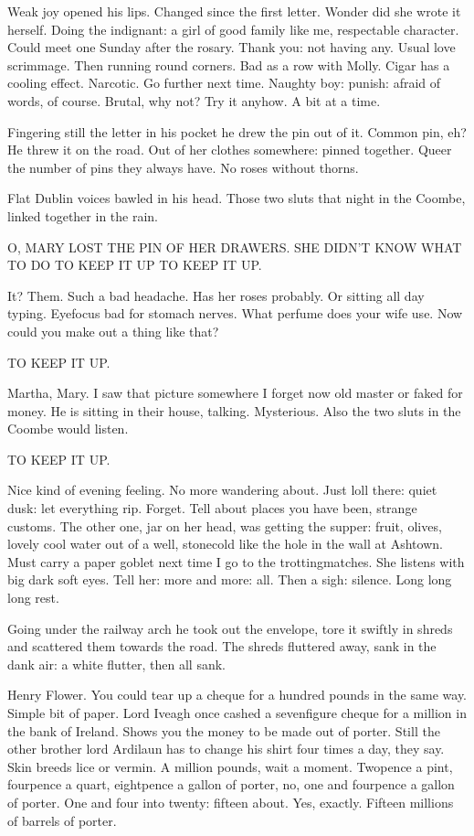 Weak joy opened his lips. Changed since the first letter. Wonder
did she wrote it herself. Doing the indignant: a girl of good
family like me, respectable character. Could meet one Sunday after the
rosary. Thank you: not having any. Usual love scrimmage. Then running
round corners. Bad as a row with Molly. Cigar has a cooling effect.
Narcotic. Go further next time. Naughty boy: punish: afraid of words, of
course. Brutal, why not? Try it anyhow. A bit at a time.

Fingering still the letter in his pocket he drew the pin out of it.
Common pin, eh? He threw it on the road. Out of her clothes somewhere:
pinned together. Queer the number of pins they always have. No roses
without thorns.

Flat Dublin voices bawled in his head. Those two sluts that night in
the Coombe, linked together in the rain.


    O, MARY LOST THE PIN OF HER DRAWERS.
    SHE DIDN'T KNOW WHAT TO DO
    TO KEEP IT UP
    TO KEEP IT UP.


It? Them. Such a bad headache. Has her roses probably. Or sitting all day
typing. Eyefocus bad for stomach nerves. What perfume does your wife
use. Now could you make out a thing like that?

    TO KEEP IT UP.

Martha, Mary. I saw that picture somewhere I forget now old master or
faked for money. He is sitting in their house, talking. Mysterious. Also
the two sluts in the Coombe would listen.

    TO KEEP IT UP.

Nice kind of evening feeling. No more wandering about. Just loll there:
quiet dusk: let everything rip. Forget. Tell about places you have been,
strange customs. The other one, jar on her head, was getting the supper:
fruit, olives, lovely cool water out of a well, stonecold like the hole in
the wall at Ashtown. Must carry a paper goblet next time I go to the
trottingmatches. She listens with big dark soft eyes. Tell her: more and
more: all. Then a sigh: silence. Long long long rest.

Going under the railway arch he took out the envelope, tore it swiftly
in shreds and scattered them towards the road. The shreds fluttered away,
sank in the dank air: a white flutter, then all sank.

Henry Flower. You could tear up a cheque for a hundred pounds in
the same way. Simple bit of paper. Lord Iveagh once cashed a sevenfigure
cheque for a million in the bank of Ireland. Shows you the money to be
made out of porter. Still the other brother lord Ardilaun has to change
his shirt four times a day, they say. Skin breeds lice or vermin. A
million pounds, wait a moment. Twopence a pint, fourpence a quart,
eightpence a gallon of porter, no, one and fourpence a gallon of porter.
One and four into twenty: fifteen about. Yes, exactly. Fifteen millions of
barrels of porter.

